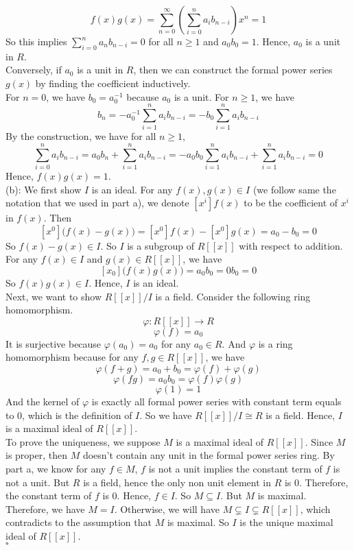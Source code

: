 \documentclass[12pt]{amsart}
\begin{document}
\[f(x)g(x)=\sum_{n=0}^\infty(\sum_{i=0}^n a_ib_{n-i})x^n=1\]
So this implies $\sum_{i=0}^n a_nb_{n-i}=0$ for all $n\geq 1$ and $a_0b_0=1$. Hence, $a_0$ is a unit in $R$.\\
Conversely, if $a_0$ is a unit in $R$, then we can construct the formal power series $g(x) $ by finding the coefficient inductively.\\
For $n=0$, we have $b_0=a_0^{-1}$ because $a_0$ is a unit. For $n\geq 1$, we have 
\[b_n=-a_0^{-1}\sum_{i=1}^na_ib_{n-i}=-b_0\sum_{i=1}^na_ib_{n-i}\]
By the construction, we have for all $n\geq 1$,
\[\sum_{i=0}^n a_ib_{n-i}=a_0b_n+\sum_{i=1}^na_ib_{n-i}=-a_0b_0\sum_{i=1}^na_ib_{n-i}+\sum_{i=1}^na_ib_{n-i}=0\]
Hence, $f(x)g(x)=1$.\\
(b): We first show $I$ is an ideal. For any $f(x),g(x)\in I$ (we follow same the notation that we used in part a), we denote $[x^i]f(x)$ to be the coefficient of $x^i$ in $f(x)$. Then $$[x^0]\big(f(x)-g(x)\big)=[x^0]f(x)-[x^0]g(x)=a_0-b_0=0$$
So $f(x)-g(x)\in I$. So $I$ is a subgroup of $R[[x]]$ with respect to addition. For any $f(x)\in I$ and $g(x)\in R[[x]]$, we have 
\[[x_0]\big(f(x)g(x)\big)=a_0b_0=0b_0=0\]
So $f(x)g(x)\in I$. Hence, $I$ is an ideal.\\
Next, we want to show $R[[x]]/I$ is a field. Consider the following ring homomorphism.
\[\varphi:R[[x]]\to R\]
\[\varphi(f)=a_0\]
It is surjective because $\varphi(a_0)=a_0$ for any $a_0\in R$. And $\varphi$ is a ring homomorphism because for any $f,g\in R[[x]]$, we have  
$$\varphi(f+g)=a_0+b_0=\varphi(f)+\varphi(g)$$
$$\varphi(fg)=a_0b_0=\varphi(f)\varphi(g)$$
$$\varphi(1)=1$$
And the kernel of $\varphi$ is exactly all formal power series with constant term equals to 0, which is the definition of $I$. So we have $R[[x]]/I\cong R$ is a field. Hence, $I$ is a maximal ideal of $R[[x]]$.\\
To prove the uniqueness, we suppose $M$ is a maximal ideal of $R[[x]]$. Since $M$ is proper, then $M$ doesn't contain any unit in the formal power series ring. By part a, we know for any $f\in M$, $f$ is not a unit implies the constant term of $f$ is not a unit. But $R$ is a field, hence the only non unit element in $R$ is 0. Therefore, the constant term of $f$ is $0$. Hence, $f\in I$. So $M\subseteq I$. But $M$ is maximal. Therefore, we have $M=I$. Otherwise, we will have $M\subsetneq I\subsetneq R[[x]]$, which contradicts to the assumption that $M$ is maximal. So $I$ is the unique maximal ideal of $R[[x]]$.
\\\phantom{qed}\hfill$\square$\\
\end{document}

